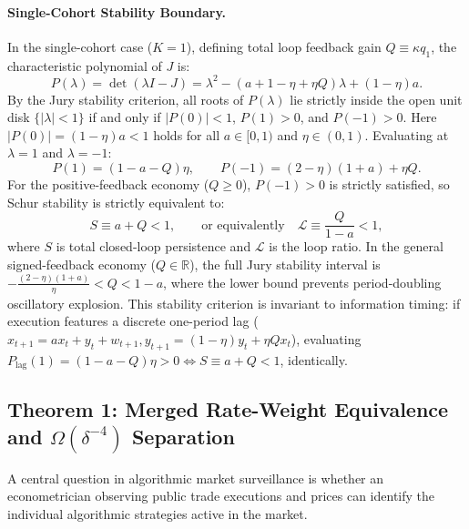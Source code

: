 \documentclass[12pt]{article}
\theoremstyle{definition}
\theoremstyle{remark}
\newcommand{\R}{\mathbb{R}}
\begin{document}
\paragraph{Single-Cohort Stability Boundary.}
In the single-cohort case ($K=1$), defining total loop feedback gain $Q \equiv \kappa q_1$, the characteristic polynomial of $J$ is:
\begin{equation}
P(\lambda) = \det(\lambda I - J) = \lambda^2 - \left( a + 1 - \eta + \eta Q \right) \lambda + (1 - \eta) a.
\label{eq:char_poly}
\end{equation}
By the Jury stability criterion, all roots of $P(\lambda)$ lie strictly inside the open unit disk $\{|\lambda| < 1\}$ if and only if $|P(0)| < 1$, $P(1) > 0$, and $P(-1) > 0$. Here $|P(0)| = (1 - \eta)a < 1$ holds for all $a \in [0, 1)$ and $\eta \in (0, 1)$. Evaluating at $\lambda = 1$ and $\lambda = -1$:
\begin{equation}
P(1) = (1 - a - Q) \eta, \qquad P(-1) = (2 - \eta)(1 + a) + \eta Q.
\end{equation}
For the positive-feedback economy ($Q \ge 0$), $P(-1) > 0$ is strictly satisfied, so Schur stability is strictly equivalent to:
\begin{equation}
S \equiv a + Q < 1, \qquad \text{or equivalently} \quad \mathcal{L} \equiv \frac{Q}{1 - a} < 1,
\label{eq:stability_cond}
\end{equation}
where $S$ is total closed-loop persistence and $\mathcal{L}$ is the loop ratio. In the general signed-feedback economy ($Q \in \R$), the full Jury stability interval is $-\frac{(2-\eta)(1+a)}{\eta} < Q < 1 - a$, where the lower bound prevents period-doubling oscillatory explosion. This stability criterion is invariant to information timing: if execution features a discrete one-period lag ($x_{t+1} = a x_t + y_t + w_{t+1}, y_{t+1} = (1 - \eta) y_t + \eta Q x_t$), evaluating $P_{\text{lag}}(1) = (1 - a - Q)\eta > 0 \iff S \equiv a + Q < 1$, identically.

\subsection{Theorem 1: Merged Rate-Weight Equivalence and \texorpdfstring{$\Omega(\delta^{-4})$}{Omega(delta\textasciicircum(-4))} Separation}
A central question in algorithmic market surveillance is whether an econometrician observing public trade executions and prices can identify the individual algorithmic strategies active in the market.
\end{document}
